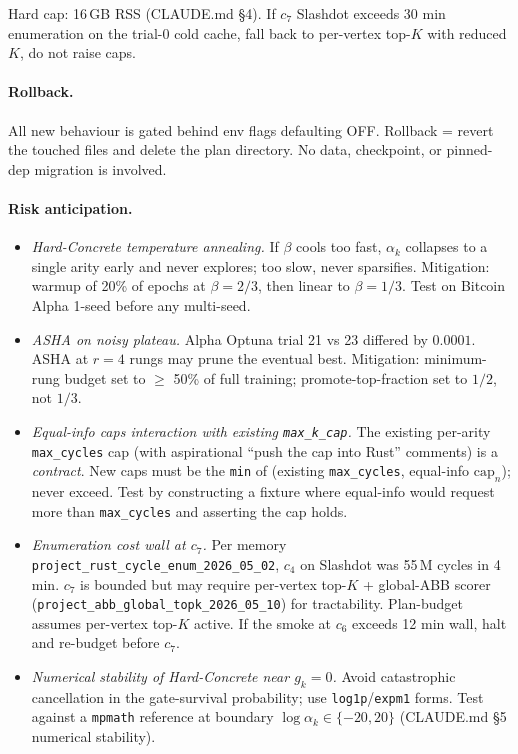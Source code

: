 \documentclass{article}
\begin{document}
\noindent Hard cap: 16\,GB RSS (CLAUDE.md \S4).  If $c_7$ Slashdot
exceeds 30 min enumeration on the trial-0 cold cache, fall back to
per-vertex top-$K$ with reduced $K$, do not raise caps.

\paragraph{Rollback.}
All new behaviour is gated behind env flags defaulting OFF.  Rollback
= revert the touched files and delete the plan directory.  No data,
checkpoint, or pinned-dep migration is involved.

\paragraph{Risk anticipation.}
\begin{itemize}
  \item \emph{Hard-Concrete temperature annealing.}  If $\beta$ cools
    too fast, $\alpha_k$ collapses to a single arity early and never
    explores; too slow, never sparsifies.  Mitigation: warmup of
    20\% of epochs at $\beta=2/3$, then linear to $\beta=1/3$.  Test
    on Bitcoin Alpha 1-seed before any multi-seed.
  \item \emph{ASHA on noisy plateau.}  Alpha Optuna trial 21 vs 23
    differed by $0.0001$.  ASHA at $r=4$ rungs may prune the eventual
    best.  Mitigation: minimum-rung budget set to $\geq$ 50\% of full
    training; promote-top-fraction set to $1/2$, not $1/3$.
  \item \emph{Equal-info caps interaction with existing
    \texttt{max\_k\_cap}.}  The existing per-arity \texttt{max\_cycles}
    cap (with aspirational ``push the cap into Rust'' comments) is a
    \emph{contract}.  New caps must be the \texttt{min} of (existing
    \texttt{max\_cycles}, equal-info $\mathrm{cap}_n$); never exceed.
    Test by constructing a fixture where equal-info would request more
    than \texttt{max\_cycles} and asserting the cap holds.
  \item \emph{Enumeration cost wall at $c_7$.}  Per memory
    \texttt{project\_rust\_cycle\_enum\_2026\_05\_02}, $c_4$ on
    Slashdot was 55\,M cycles in 4\,min.  $c_7$ is bounded but may
    require per-vertex top-$K$ + global-ABB scorer
    (\texttt{project\_abb\_global\_topk\_2026\_05\_10}) for tractability.
    Plan-budget assumes per-vertex top-$K$ active.  If the smoke at
    $c_6$ exceeds 12 min wall, halt and re-budget before $c_7$.
  \item \emph{Numerical stability of Hard-Concrete near $g_k=0$.}
    Avoid catastrophic cancellation in the gate-survival probability;
    use \texttt{log1p}/\texttt{expm1} forms.  Test against a
    \texttt{mpmath} reference at boundary $\log\alpha_k \in \{-20, 20\}$
    (CLAUDE.md \S5 numerical stability).
\end{itemize}
\end{document}
